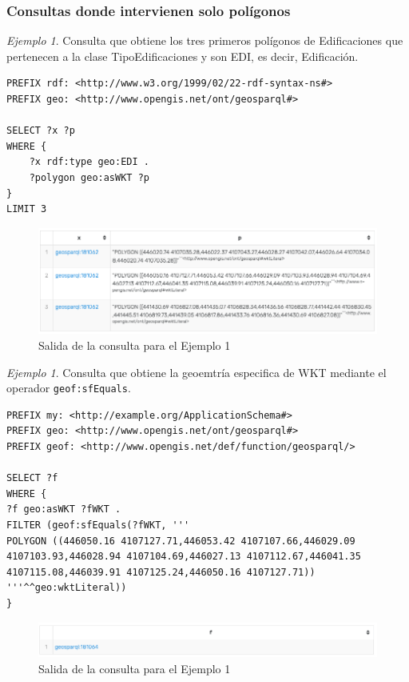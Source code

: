 \subsubsection{Consultas donde intervienen solo polígonos}

\textit{Ejemplo 1}. Consulta que obtiene los tres primeros polígonos de Edificaciones que pertenecen a la clase TipoEdificaciones y son EDI, es decir, Edificación. \\

\begin{lstlisting}
PREFIX rdf: <http://www.w3.org/1999/02/22-rdf-syntax-ns#>
PREFIX geo: <http://www.opengis.net/ont/geosparql#>

SELECT ?x ?p
WHERE {
	?x rdf:type geo:EDI .
	?polygon geo:asWKT ?p
}
LIMIT 3
\end{lstlisting}

\begin{figure}[H]
	\centering
	\includegraphics[width=0.9\linewidth]{imagenes/capitulo5/salida3}
	\caption{Salida de la consulta para el Ejemplo 1}
	\label{fig:salida3}
\end{figure}

\textit{Ejemplo 1}. Consulta que obtiene la geoemtría especifica de WKT mediante el operador \texttt{geof:sfEquals}.\\

\begin{lstlisting}
PREFIX my: <http://example.org/ApplicationSchema#>
PREFIX geo: <http://www.opengis.net/ont/geosparql#>
PREFIX geof: <http://www.opengis.net/def/function/geosparql/>

SELECT ?f
WHERE {
?f geo:asWKT ?fWKT .
FILTER (geof:sfEquals(?fWKT, '''
POLYGON ((446050.16 4107127.71,446053.42 4107107.66,446029.09 4107103.93,446028.94 4107104.69,446027.13 4107112.67,446041.35 4107115.08,446039.91 4107125.24,446050.16 4107127.71))
'''^^geo:wktLiteral))
} 
\end{lstlisting}

\begin{figure}[H]
	\centering
	\includegraphics[width=0.9\linewidth]{imagenes/capitulo5/salida2}
	\caption{Salida de la consulta para el Ejemplo 1}
	\label{fig:salida2}
\end{figure}

